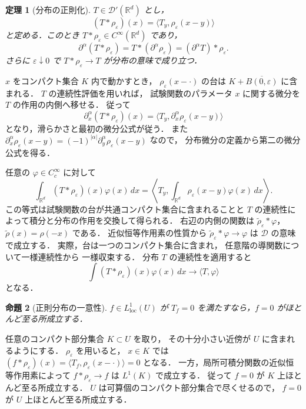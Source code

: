 \documentclass[a5paper,10pt,onecolumn]{jsarticle}
\makeatletter
\theoremstyle{mathnotetheorem}
\newtheorem{theorem}{定理}[section]
\newtheorem{proposition}[theorem]{命題}
\renewcommand{\proofname}{証明}
\renewenvironment{proof}[1][\proofname]{%
  \par\pushQED{\qed}\normalfont\topsep4\p@\@plus2\p@\relax
  \trivlist\item[\hskip\labelsep\bfseries #1]\ignorespaces
}{\popQED\endtrivlist\@endpefalse}
\makeatother
\begin{document}
\begin{theorem}[分布の正則化]\label{thm:regularization}
$T\in\mathcal D'(\mathbb R^d)$ とし，
\[
 (T*\rho_\varepsilon)(x)
 =\langle T_y,\rho_\varepsilon(x-y)\rangle
\]
と定める．このとき
$T*\rho_\varepsilon\in C^\infty(\mathbb R^d)$ であり，
\[
 \partial^\alpha(T*\rho_\varepsilon)
 =T*(\partial^\alpha\rho_\varepsilon)
 =(\partial^\alpha T)*\rho_\varepsilon.
\]
さらに $\varepsilon\downarrow0$ で
$T*\rho_\varepsilon\to T$ が分布の意味で成り立つ．
\end{theorem}
\begin{proof}
$x$ をコンパクト集合 $K$ 内で動かすとき，
$\rho_\varepsilon(x-\cdot)$ の台は
$K+\overline{B(0,\varepsilon)}$ に含まれる．
$T$ の連続性評価を用いれば，
試験関数のパラメータ $x$ に関する微分を
$T$ の作用の内側へ移せる．
従って
\[
 \partial_x^\alpha(T*\rho_\varepsilon)(x)
 =\langle T_y,\partial_x^\alpha\rho_\varepsilon(x-y)\rangle
\]
となり，滑らかさと最初の微分公式が従う．
また
$\partial_x^\alpha\rho_\varepsilon(x-y)
 =(-1)^{|\alpha|}\partial_y^\alpha\rho_\varepsilon(x-y)$ なので，
分布微分の定義から第二の微分公式を得る．

任意の $\varphi\in C_c^\infty$ に対して
\[
 \int_{\mathbb R^d}(T*\rho_\varepsilon)(x)\varphi(x)\,dx
 =\left\langle T_y,
     \int_{\mathbb R^d}
      \rho_\varepsilon(x-y)\varphi(x)\,dx
   \right\rangle.
\]
この等式は試験関数の台が共通コンパクト集合に含まれることと
$T$ の連続性によって積分と分布の作用を交換して得られる．
右辺の内側の関数は
$\widetilde\rho_\varepsilon*\varphi$，
$\widetilde\rho(x)=\rho(-x)$ である．
近似恒等作用素の性質から
$\widetilde\rho_\varepsilon*\varphi\to\varphi$
は $\mathcal D$ の意味で成立する．
実際，台は一つのコンパクト集合に含まれ，
任意階の導関数について一様連続性から
一様収束する．
分布 $T$ の連続性を適用すると
\[
 \int(T*\rho_\varepsilon)(x)\varphi(x)\,dx
 \longrightarrow\langle T,\varphi\rangle
\]
となる．
\end{proof}

\begin{proposition}[正則分布の一意性]\label{prop:inject}
$f\in L_{\mathrm{loc}}^1(U)$ が
$T_f=0$ を満たすなら，$f=0$ がほとんど至る所成立する．
\end{proposition}
\begin{proof}
任意のコンパクト部分集合 $K\subset U$ を取り，
その十分小さい近傍が $U$ に含まれるようにする．
$\rho_\varepsilon$ を用いると，
$x\in K$ では
$(f*\rho_\varepsilon)(x)
 =\langle T_f,\rho_\varepsilon(x-\cdot)\rangle=0$
となる．
一方，局所可積分関数の近似恒等作用素によって
$f*\rho_\varepsilon\to f$ は $L^1(K)$ で成立する．
従って $f=0$ が $K$ 上ほとんど至る所成立する．
$U$ は可算個のコンパクト部分集合で尽くせるので，
$f=0$ が $U$ 上ほとんど至る所成立する．
\end{proof}
\end{document}
